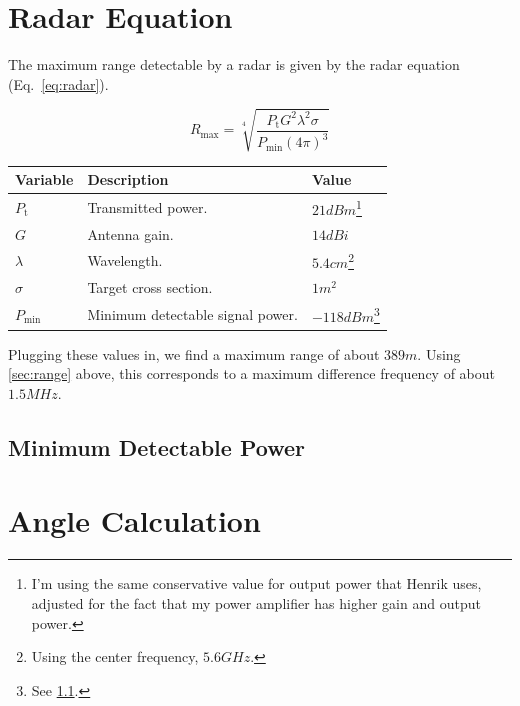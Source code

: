 \documentclass{default}
\begin{document}
\section{Radar Equation}
\label{sec:radar-equation}

The maximum range detectable by a radar is given by the radar equation (Eq.~\ref{eq:radar}).

\begin{equation}
        \label{eq:radar}
        R_{\text{max}} = \sqrt[4]{\frac{P_{\text{t}} G^2 \lambda^2 \sigma}{P_{\text{min}} {(4
              \pi)}^3}}
\end{equation}

\label{tab:radar-equation}
\begin{tabularx}{\textwidth}{l X l}
        \toprule
        Variable & Description & Value \\
        \midrule
        $P_{\text{t}}$ & Transmitted power. & $21 \si{dBm}$\footnote{I'm using the same conservative
        value for output power that Henrik uses, adjusted for the fact that my power amplifier has
        higher gain and output power.} \\
        $G$ & Antenna gain. & $14 \si{dBi}$ \\
        $\lambda$ & Wavelength. & $5.4 \si{cm}$\footnote{Using the center frequency, $5.6 \si{GHz}$.} \\
        $\sigma$ & Target cross section. & $1 \si{m^2}$ \\
        $P_{\text{min}}$ & Minimum detectable signal power. & $-118 \si{dBm}$\footnote{See
          \cref{sec:min-detectable-power}.} \\
        \bottomrule
\end{tabularx}

Plugging these values in, we find a maximum range of about $389 \si{m}$. Using \cref{sec:range}
above, this corresponds to a maximum difference frequency of about $1.5 \si{MHz}$.

\subsection{Minimum Detectable Power}
\label{sec:min-detectable-power}


\section{Angle Calculation}
\label{sec:angle}
\end{document}
